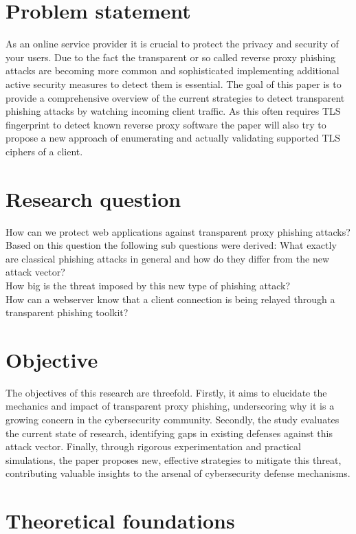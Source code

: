 \documentclass[12pt]{scrbook}
\begin{document}
\newpage
\section{Problem statement}
As an online service provider it is crucial to protect the privacy and security of your users.
Due to the fact the transparent or so called reverse proxy phishing attacks are becoming more common and sophisticated
implementing additional active security measures to detect them is essential.
The goal of this paper is to provide a comprehensive overview of the current
strategies to detect transparent phishing attacks by watching incoming client traffic.
As this often requires TLS fingerprint to detect known reverse proxy software the paper will also
try to propose a new approach of enumerating and actually validating supported TLS ciphers of a client.

\section{Research question}
How can we protect web applications against transparent proxy phishing attacks? Based on this
question the following sub questions were derived:
What exactly are classical phishing attacks in general and how do they differ from the new attack vector?\\
How big is the threat imposed by this new type of phishing attack?\\
How can a webserver know that a client connection is being relayed through a transparent phishing toolkit?

\section{Objective} 
The objectives of this research are threefold. Firstly, it aims to elucidate the mechanics and impact of transparent proxy phishing, underscoring why it is a growing concern in the cybersecurity community. Secondly, the study evaluates the current state of research, identifying gaps in existing defenses against this attack vector. Finally, through rigorous experimentation and practical simulations, the paper proposes new, effective strategies to mitigate this threat, contributing valuable insights to the arsenal of cybersecurity defense mechanisms. 

\newpage \section{Theoretical foundations}
\end{document}
